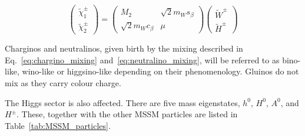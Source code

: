 				\begin{equation}
				\label{eq:chargino_mixing}
						\begin{pmatrix}  \tilde{\chi}^{\pm}_1 \\ \tilde{\chi}^{\pm}_2 \end{pmatrix}	
						= 
						\begin{pmatrix}
							M_2 & \sqrt{2} m_W s_\beta \\
							\sqrt{2} m_W c_\beta & \mu  
						\end{pmatrix}
						\begin{pmatrix}
							\tilde{W}^{\pm} \\
							\tilde{H}^{\pm}
						\end{pmatrix}
				\end{equation}

				Charginos and neutralinos, given birth by the mixing described in Eq.~\ref{eq:chargino_mixing} and~\ref{eq:neutralino_mixing}, will be referred to as bino-like, wino-like or higgsino-like depending on their phenomenology. Gluinos do not mix as they carry colour charge. 

				The Higgs sector is also affected. There are five mass eigenstates, $h^0$, $H^0$, $A^0$, and $H^{\pm}$. These, together with the other MSSM particles are listed in Table~\ref{tab:MSSM_particles}. 
				
